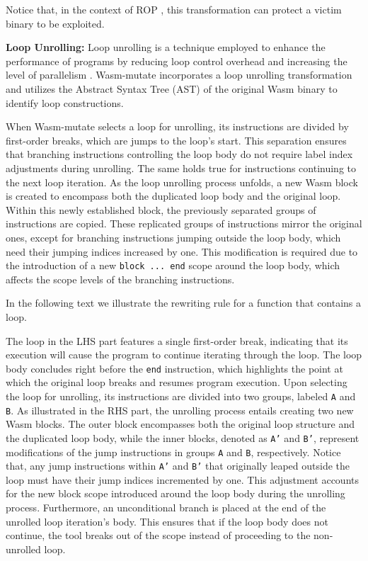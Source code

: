 \documentclass[sigplan,screen]{acmart}
\newcommand{\tool}{Wasm-mutate\xspace}
\begin{document}
Notice that, in the context of ROP \cite{Swivel}, this transformation can protect a victim binary to be exploited. 



\textbf{Loop Unrolling:} 
Loop unrolling is a technique employed to enhance the performance of programs by reducing loop control overhead and increasing the level of parallelism \cite{dongarra1979unrolling}. 
\tool incorporates a loop unrolling transformation and utilizes the Abstract Syntax Tree (AST) of the original Wasm binary to identify loop constructions. 

When \tool selects a loop for unrolling, its instructions are divided by first-order breaks, which are jumps to the loop's start. This separation ensures that branching instructions controlling the loop body do not require label index adjustments during unrolling. The same holds true for instructions continuing to the next loop iteration.
As the loop unrolling process unfolds, a new Wasm block is created to encompass both the duplicated loop body and the original loop. 
Within this newly established block, the previously separated groups of instructions are copied. 
These replicated groups of instructions mirror the original ones, except for branching instructions jumping outside the loop body, which need their jumping indices increased by one. This modification is required due to the introduction of a new \texttt{block ... end} scope around the loop body, which affects the scope levels of the branching instructions.

In the following text we illustrate the rewriting rule for a function that contains a loop. 


The loop in the LHS part features a single first-order break, indicating that its execution will cause the program to continue iterating through the loop. 
The loop body concludes right before the \texttt{end} instruction, which highlights the point at which the original loop breaks and resumes program execution.
Upon selecting the loop for unrolling, its instructions are divided into two groups, labeled \texttt{A} and \texttt{B}. 
As illustrated in the RHS part, the unrolling process entails creating two new Wasm blocks. 
The outer block encompasses both the original loop structure and the duplicated loop body, while the inner blocks, denoted as \texttt{A'} and \texttt{B'}, represent modifications of the jump instructions in groups \texttt{A} and \texttt{B}, respectively.
Notice that, any jump instructions within \texttt{A'} and \texttt{B'} that originally leaped outside the loop must have their jump indices incremented by one. 
This adjustment accounts for the new block scope introduced around the loop body during the unrolling process. 
Furthermore, an unconditional branch is placed at the end of the unrolled loop iteration's body. 
This ensures that if the loop body does not continue, the tool breaks out of the scope instead of proceeding to the non-unrolled loop.
\end{document}
